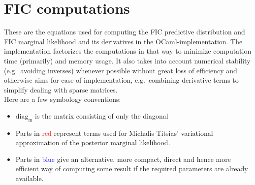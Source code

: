 \documentclass[12pt]{article}
\newcommand{\red}{\textcolor{red}}
\newcommand{\blue}{\textcolor{blue}}
\begin{document}
\section{FIC computations}

These are the equations used for computing the FIC predictive
distribution and FIC marginal likelihood and its derivatives in the
OCaml-implementation.  The implementation factorizes the computations
in that way to minimize computation time (primarily) and memory
usage.  It also takes into account numerical stability (e.g.\
avoiding inverses) whenever possible without great loss of efficiency
and otherwise aims for ease of implementation, e.g.\ combining
derivative terms to simplify dealing with sparse matrices.\\

Here are a few symbology conventions:

\begin{itemize}
\item $\mathrm{diag_m}$ is the matrix consisting of only the diagonal
\item Parts in \red{red} represent terms used for Michalis Titsias'
variational approximation of the posterior marginal likelihood.
\item Parts in \blue{blue} give an alternative, more compact, direct
and hence more efficient way of computing some result if the required
parameters are already available.
\end{itemize}
\end{document}
